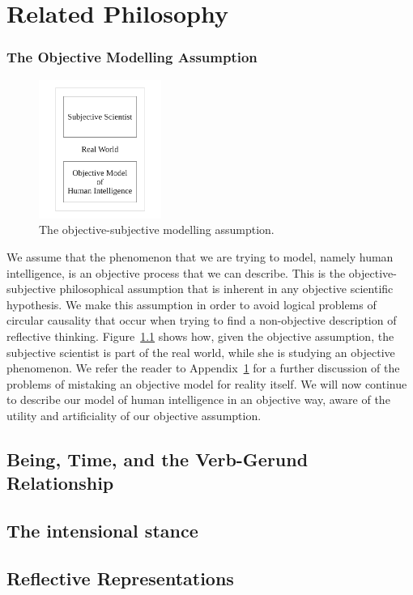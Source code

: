 \chapter{Related Philosophy}\label{appendix:philosophy}

\subsection{The Objective Modelling Assumption}

\begin{figure}[bth]
  \center
  \includegraphics[width=4cm]{gfx/objective_description}
  \caption[The objective-subjective modelling assumption]{The objective-subjective modelling assumption.}
  \label{fig:objective_description}
\end{figure}

We assume that the phenomenon that we are trying to model, namely
human intelligence, is an objective process that we can describe.
This is the objective-subjective philosophical assumption that is
inherent in any objective scientific hypothesis.  We make this
assumption in order to avoid logical problems of circular causality
that occur when trying to find a non-objective description of
reflective thinking.  Figure~\ref{fig:objective_description} shows
how, given the objective assumption, the subjective scientist is part
of the real world, while she is studying an objective phenomenon.  We
refer the reader to Appendix~\ref{appendix:philosophy} for a further
discussion of the problems of mistaking an objective model for reality
itself.  We will now continue to describe our model of human
intelligence in an objective way, aware of the utility and
artificiality of our objective assumption.

\section{Being, Time, and the Verb-Gerund Relationship}

\section{The intensional stance}

\section{Reflective Representations}

\cite{perner:1991}

